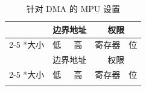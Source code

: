 \begin{longtable}[h]{|p{1.5cm}|p{3cm}|p{3cm}|p{6cm}|p{1.5cm}|}


    \caption{针对 DMA 的 MPU 设置}
    \label{table:MPU_for_DMA}
    \\\hline
    \rowcolor{lightgray}
    & \multicolumn{2}{c|}{边界地址} & \multicolumn{2}{c|}{权限} \\
    \cline{2-5}
    \rowcolor{lightgray}
    \multirow{-2}*{大小} & 低 & 高 & 寄存器 & 位 \\
    \hline
    \endfirsthead
    
    \hline
    \rowcolor{lightgray}
    & \multicolumn{2}{c|}{边界地址} & \multicolumn{2}{c|}{权限} \\
    \cline{2-5}
    \rowcolor{lightgray}
    \multirow{-2}*{大小} & 低 & 高 & 寄存器 & 位  \\
    \hline
    \endhead
    
    \endfoot
    
    \hline
    \endlastfoot
    

\end{longtable}
